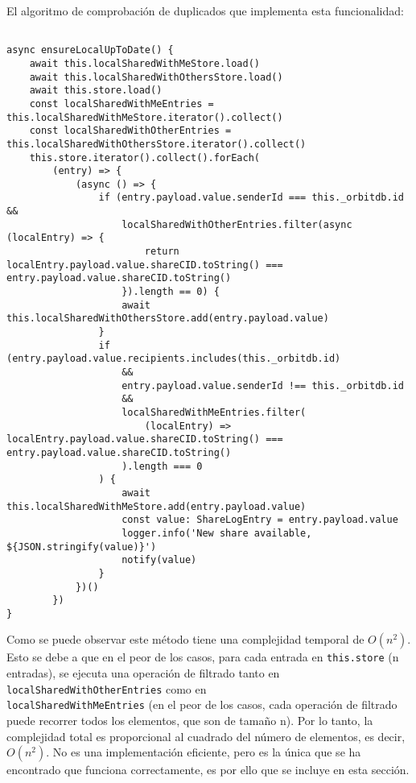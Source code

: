 El algoritmo de comprobación de duplicados que implementa esta funcionalidad:
\begin{verbatim}

async ensureLocalUpToDate() { 
    await this.localSharedWithMeStore.load()
    await this.localSharedWithOthersStore.load()
    await this.store.load()
    const localSharedWithMeEntries = this.localSharedWithMeStore.iterator().collect()
    const localSharedWithOtherEntries = this.localSharedWithOthersStore.iterator().collect()
    this.store.iterator().collect().forEach(
        (entry) => { 
            (async () => {
                if (entry.payload.value.senderId === this._orbitdb.id &&
                    localSharedWithOtherEntries.filter(async (localEntry) => {
                        return localEntry.payload.value.shareCID.toString() === entry.payload.value.shareCID.toString()
                    }).length == 0) {
                    await this.localSharedWithOthersStore.add(entry.payload.value)
                }
                if (entry.payload.value.recipients.includes(this._orbitdb.id)
                    &&
                    entry.payload.value.senderId !== this._orbitdb.id
                    &&
                    localSharedWithMeEntries.filter(
                        (localEntry) => localEntry.payload.value.shareCID.toString() === entry.payload.value.shareCID.toString()
                    ).length === 0
                ) {
                    await this.localSharedWithMeStore.add(entry.payload.value)
                    const value: ShareLogEntry = entry.payload.value
                    logger.info('New share available, ${JSON.stringify(value)}')
                    notify(value)
                }
            })()
        })
}
\end{verbatim}

Como se puede observar este método tiene una complejidad temporal de $O(n^2)$. Esto se debe a que en el peor de los casos, para cada entrada en \texttt
{this.store} (n entradas), se ejecuta una operación de filtrado tanto en \texttt{localSharedWithOtherEntries} como en
\\\texttt{localSharedWithMeEntries} (en el peor de los casos, cada operación de filtrado puede recorrer todos los elementos, que son de tamaño n). Por
lo tanto, la complejidad total es proporcional al cuadrado del número de elementos, es decir, $O(n^2)$. No es una implementación eficiente, pero es la única que se ha encontrado que funciona correctamente, es por ello que se incluye en esta sección.


